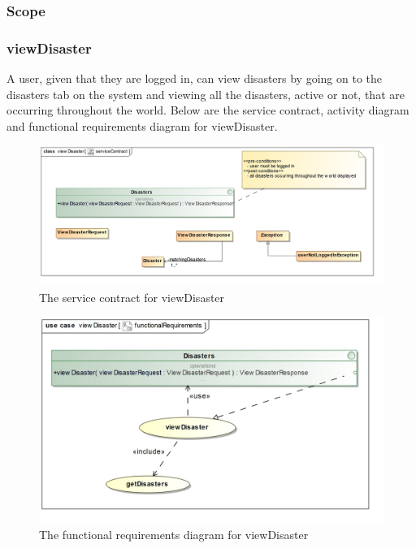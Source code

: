 \subsubsection{Scope}


\subsubsection{viewDisaster}

A user, given that they are logged in, can view disasters by going on to the disasters tab on the system and viewing all the disasters, active or not, that are occurring throughout the world. Below are the service contract, activity diagram and functional requirements diagram for viewDisaster.

\begin{figure}[H]
	\centering
	\includegraphics[scale=0.19]{../images/funcReq/viewDisasterServiceContract.jpg} 
	\caption{The service contract for viewDisaster \label{overflow}}
\end{figure}

\begin{figure}[H]
	\centering
	\includegraphics[width=1.2\textwidth]{../images/funcReq/viewDisasterFunctionalRequirements.jpg}
	\caption{The functional requirements diagram for viewDisaster \label{overflow}}
\end{figure}

